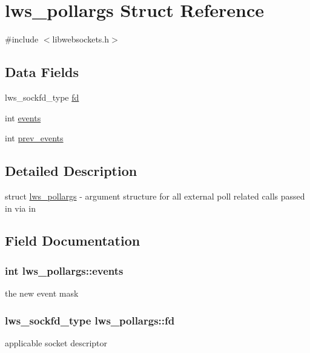 \hypertarget{structlws__pollargs}{}\section{lws\+\_\+pollargs Struct Reference}
\label{structlws__pollargs}


{\ttfamily \#include $<$libwebsockets.\+h$>$}

\subsection*{Data Fields}
\begin{DoxyCompactItemize}
\item 
lws\+\_\+sockfd\+\_\+type \hyperlink{structlws__pollargs_af14a48ef4e78128aef9a76902b104a81}{fd}
\item 
int \hyperlink{structlws__pollargs_a00bbffea9f55de342783e32d71ce1de6}{events}
\item 
int \hyperlink{structlws__pollargs_a437fec0de5cf264371e1ab5a401e86d8}{prev\+\_\+events}
\end{DoxyCompactItemize}


\subsection{Detailed Description}
struct \hyperlink{structlws__pollargs}{lws\+\_\+pollargs} -\/ argument structure for all external poll related calls passed in via \textquotesingle{}in\textquotesingle{} 

\subsection{Field Documentation}
\subsubsection[{\texorpdfstring{events}{events}}]{\setlength{\rightskip}{0pt plus 5cm}int lws\+\_\+pollargs\+::events}\hypertarget{structlws__pollargs_a00bbffea9f55de342783e32d71ce1de6}{}\label{structlws__pollargs_a00bbffea9f55de342783e32d71ce1de6}
the new event mask 
\subsubsection[{\texorpdfstring{fd}{fd}}]{\setlength{\rightskip}{0pt plus 5cm}lws\+\_\+sockfd\+\_\+type lws\+\_\+pollargs\+::fd}\hypertarget{structlws__pollargs_af14a48ef4e78128aef9a76902b104a81}{}\label{structlws__pollargs_af14a48ef4e78128aef9a76902b104a81}
applicable socket descriptor 
